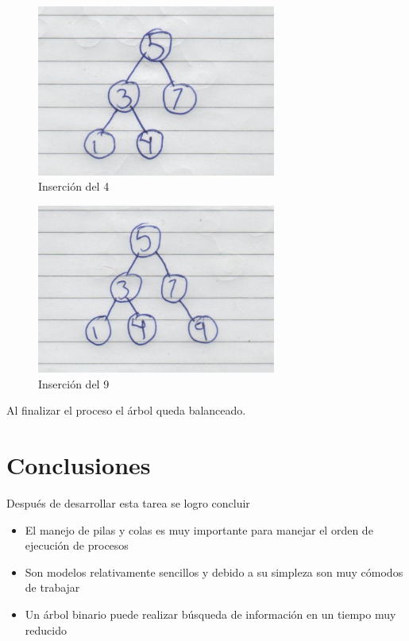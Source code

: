 \begin{figure}[H]
	\centering
	\includegraphics[width=0.7\textwidth]{./images/otraimagen7.jpg}
	\caption{Inserción del 4}
\end{figure}
\begin{figure}[H]
	\centering
	\includegraphics[width=0.7\textwidth]{./images/otraimagen8.jpg}
	\caption{Inserción del 9}
\end{figure}
Al finalizar el proceso el árbol queda balanceado.
\section{Conclusiones}
Después de desarrollar esta tarea se logro concluir
\begin{itemize}
	\item El manejo de pilas y colas es muy importante para manejar el orden de ejecución de procesos
	\item Son modelos relativamente sencillos y debido a su simpleza son muy cómodos de trabajar
	\item Un árbol binario puede realizar búsqueda de información en un tiempo muy reducido
\end{itemize}
